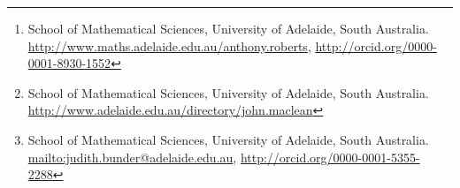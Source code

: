 


\author{A.~J.~Roberts%
\thanks{School of Mathematical Sciences, University of Adelaide, South Australia.
\url{http://www.maths.adelaide.edu.au/anthony.roberts},
\url{http://orcid.org/0000-0001-8930-1552}}
%
\and John~Maclean%
\thanks{School of Mathematical Sciences, University of Adelaide, South Australia.
\url{http://www.adelaide.edu.au/directory/john.maclean}}
%
\and J.~E.~Bunder%
\thanks{School of Mathematical Sciences, University of Adelaide, South Australia.
\protect\url{mailto:judith.bunder@adelaide.edu.au},
\protect\url{http://orcid.org/0000-0001-5355-2288}}
%
}

\date{\today}

\renewcommand{\and}{\hspace{2em plus 1em minus 1em}}


\usepackage[T1]{fontenc}
\usepackage[dvipsnames]{xcolor}


\usepackage{pgfplots} 
\pgfplotsset{compat=newest} %
\usetikzlibrary{decorations.markings}
\usetikzlibrary{shapes,arrows,fit}
\usetikzlibrary{positioning}

\def\figurename{\em Figure}

\usepackage{fancyvrb}
\newenvironment{matlab}%
    {\Verbatim[numbers=left,firstnumber=\the\inputlineno]}%
    {\endVerbatim}
\makeatletter
\def\fancyvrbStartStop{%
  \edef\FancyVerbStartString{\@percentchar\@charrb} 
  \edef\FancyVerbStopString{\@percentchar\@charlb} }
\makeatother


\usepackage{natbib}

\AtBeginDocument{\let\harvardurl\url}

\usepackage{versions}
\newenvironment{devMan}{}{} %
\newenvironment{userMan}{}{} %


\usepackage{url,microtype,amsmath,amssymb,defns,graphicx,hyperref,doi}
\hypersetup{colorlinks
    ,linkcolor=RoyalBlue,citecolor=RoyalBlue,pagecolor=RoyalBlue%
    ,urlcolor=magenta,filecolor=magenta,breaklinks%
    ,dvips,bookmarks,bookmarksopen}
\makeatletter
\AtBeginDocument{{\def\and{, }\def\thanks#1{}%
  \hypersetup{
    pdfauthor={\@author},
    pdftitle={\@title}}}
    }
\makeatother
\usepackage[capitalise,nameinlink,noabbrev]{cleveref}

